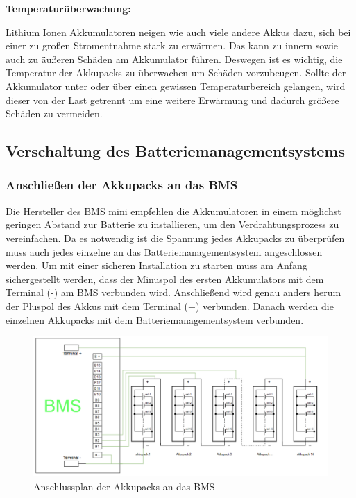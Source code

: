 \textbf{Temperaturüberwachung:}

Lithium Ionen Akkumulatoren neigen wie auch viele andere Akkus dazu, sich bei einer zu großen Stromentnahme stark zu erwärmen. Das kann zu innern sowie auch zu äußeren Schäden am Akkumulator führen. Deswegen ist es wichtig, die Temperatur der Akkupacks zu überwachen um Schäden vorzubeugen. Sollte der Akkumulator unter oder über einen gewissen Temperaturbereich gelangen, wird dieser von der Last getrennt um eine weitere Erwärmung und dadurch größere Schäden zu vermeiden.
\newpage

\subsection{Verschaltung des Batteriemanagementsystems}

\subsubsection{Anschließen der Akkupacks an das BMS}

Die Hersteller des BMS mini empfehlen die Akkumulatoren in einem möglichst geringen Abstand zur Batterie zu installieren, um den Verdrahtungsprozess zu vereinfachen. Da es notwendig ist die Spannung jedes Akkupacks zu überprüfen muss auch jedes einzelne an das Batteriemanagementsystem angeschlossen werden. Um mit einer sicheren Installation zu starten muss am Anfang sichergestellt werden, dass der Minuspol des ersten Akkumulators mit dem Terminal (-) am BMS verbunden wird. Anschließend wird genau anders herum der Pluspol des Akkus mit dem Terminal (+) verbunden. Danach werden die einzelnen Akkupacks mit dem Batteriemanagementsystem verbunden.

\begin{figure}[H]
	\begin{center}
		\includegraphics[scale=0.7]{figures/Akku/BMSAkkupacks.PNG}
		\caption{Anschlussplan der Akkupacks an das BMS}
	\end{center}
\end{figure}


